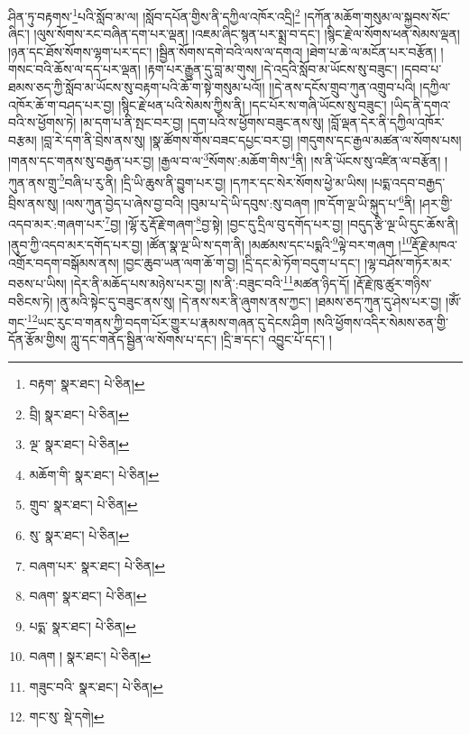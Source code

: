 ཤིན་ཏུ་བརྟགས་\footnote{བརྟག་  སྣར་ཐང་།  པེ་ཅིན། }པའི་སློབ་མ་ལ། །སློབ་དཔོན་གྱིས་ནི་དཀྱིལ་འཁོར་འདྲི།\footnote{བྲི།  སྣར་ཐང་།  པེ་ཅིན། } །དཀོན་མཆོག་གསུམ་ལ་སྐྱབས་སོང་ཞིང་། །ལུས་སོགས་རང་བཞིན་དག་པར་ལྡན། །འཇམ་ཞིང་སྙན་པར་སྨྲ་བ་དང་། །སྙིང་རྗེ་ལ་སོགས་ཕན་སེམས་ལྡན། །ཉན་དང་ཐོས་སོགས་ལྷག་པར་དང་། །སྦྱིན་སོགས་དགེ་བའི་ལས་ལ་དགའ། །ཐེག་པ་ཆེ་ལ་མངོན་པར་བརྩོན། །གསང་བའི་ཆོས་ལ་དད་པར་ལྡན། །རྟག་པར་རྒྱུན་དུ་བླ་མ་གུས། །དེ་འདྲའི་སློབ་མ་ཡོངས་སུ་བཟུང་། །དབབ་པ་ཐམས་ཅད་ཀྱི་སློབ་མ་ཡོངས་སུ་བརྟག་པའི་ཆོ་ག་སྟེ་གསུམ་པའོ།། །།དེ་ནས་དངོས་གྲུབ་ཀུན་འགྲུབ་པའི། །དཀྱིལ་འཁོར་ཆོ་ག་བཤད་པར་བྱ། །སྙིང་རྗེ་ཕན་པའི་སེམས་ཀྱིས་ནི། །དང་པོར་ས་གཞི་ཡོངས་སུ་བཟུང་། །ཡིད་ནི་དགའ་བའི་ས་ཕྱོགས་ཏེ། །མ་དག་པ་ནི་སྤང་བར་བྱ། །དག་པའི་ས་ཕྱོགས་བཟུང་ནས་སུ། །བློ་ལྡན་དེར་ནི་དཀྱིལ་འཁོར་བརྩམ། །བླ་རེ་དག་ནི་བྲེས་ནས་སུ། །སྣ་ཚོགས་གོས་བཟང་དཔྱང་བར་བྱ། །གདུགས་དང་རྒྱལ་མཚན་ལ་སོགས་པས། །གནས་དང་གནས་སུ་བརྒྱན་པར་བྱ། །རྒྱལ་བ་ལ་\footnote{ལྔ་  སྣར་ཐང་།  པེ་ཅིན། }སོགས་:མཆོག་གིས་\footnote{མཆོག་གི་  སྣར་ཐང་།  པེ་ཅིན། }ནི། །ས་ནི་ཡོངས་སུ་འཛིན་ལ་བརྩོན། །ཀུན་ནས་གྲུ་\footnote{གྲུབ་  སྣར་ཐང་།  པེ་ཅིན། }བཞི་པ་རུ་ནི། །དྲི་ཡི་ཆུས་ནི་བྱུག་པར་བྱ། །དཀར་དང་སེར་སོགས་ཕྱེ་མ་ཡིས། །པདྨ་འདབ་བརྒྱད་བྲིས་ནས་སུ། །ལས་ཀུན་བྱེད་པ་ཞེས་བྱ་བའི། །བུམ་པ་དེ་ཡི་དབུས་:སུ་བཞག །ཁ་དོག་ལྔ་ཡི་སྐུད་པ་\footnote{སུ་  སྣར་ཐང་།  པེ་ཅིན། }ནི། །ཤར་གྱི་འདབ་མར་:གཞག་པར་\footnote{བཞག་པར་  སྣར་ཐང་།  པེ་ཅིན། }བྱ། །ལྷོ་རུ་རྡོ་རྗེ་གཞག་\footnote{བཞག་  སྣར་ཐང་།  པེ་ཅིན། }བྱ་སྟེ། །བྱང་དུ་དྲིལ་བུ་དགོད་པར་བྱ། །བདུད་རྩི་ལྔ་ཡི་དུང་ཆོས་ནི། །ནུབ་ཀྱི་འདབ་མར་དགོད་པར་བྱ། །ཚོན་སྣ་ལྔ་ཡི་ས་དག་ནི། །མཚམས་དང་པདྨའི་\footnote{པདྨ་  སྣར་ཐང་།  པེ་ཅིན། }ལྟེ་བར་གཞག །\footnote{བཞག །  སྣར་ཐང་།  པེ་ཅིན། }རྡོ་རྗེ་མཁའ་འགྲོར་བདག་བསྒོམས་ནས། །བྱང་ཆུབ་ཡན་ལག་ཆོ་ག་བྱ། །དྲི་དང་མེ་ཏོག་བདུག་པ་དང་། །ལྷ་བཤོས་གཏོར་མར་བཅས་པ་ཡིས། །དེར་ནི་མཆོད་པས་མཉེས་པར་བྱ། །ས་ནི་:བཟུང་བའི་\footnote{གཟུང་བའི་  སྣར་ཐང་།  པེ་ཅིན། }མཚན་ཉིད་དོ། །རྡོ་རྗེ་ཁུ་ཚུར་གཉིས་བཅིངས་ཏེ། །ནུ་མའི་སྟེང་དུ་བཟུང་ནས་སུ། །དེ་ནས་སར་ནི་ཞུགས་ནས་ཀྱང་། །ཐམས་ཅད་ཀུན་དུ་ཤེས་པར་བྱ། །ཨོཾ་གང་\footnote{གང་སུ་  སྡེ་དགེ། }ཡང་རུང་བ་གནས་ཀྱི་བདག་པོར་གྱུར་པ་རྣམས་གཞན་དུ་དེངས་ཤིག །སའི་ཕྱོགས་འདིར་སེམས་ཅན་གྱི་དོན་རྩོམ་གྱིས། ཀླུ་དང་གནོད་སྦྱིན་ལ་སོགས་པ་དང་། །དྲི་ཟ་དང་། འབྱུང་པོ་དང་། །
